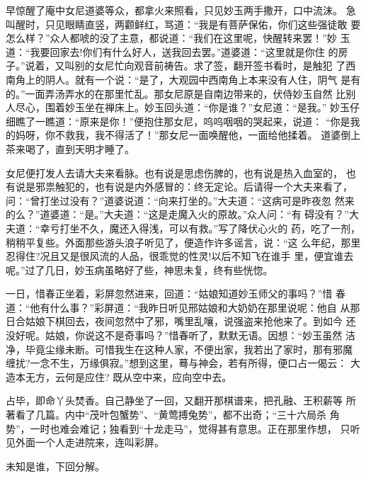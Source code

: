 早惊醒了庵中女尼道婆等众，都拿火来照看，只见妙玉两手撒开，口中流沫。
急叫醒时，只见眼睛直竖，两颧鲜红，骂道：“我是有菩萨保佑，你们这些强徒敢
要怎么样？”众人都唬的没了主意，都说道：“我们在这里呢，快醒转来罢！”妙
玉道：“我要回家去!你们有什么好人，送我回去罢。”道婆道：“这里就是你住
的房子。”说着，又叫别的女尼忙向观音前祷告。求了签，翻开签书看时，是触犯
了西南角上的阴人。就有一个说：“是了，大观园中西南角上本来没有人住，阴气
是有的。”一面弄汤弄水的在那里忙乱。那女尼原是自南边带来的，伏侍妙玉自然
比别人尽心，围着妙玉坐在禅床上。妙玉回头道：“你是谁？”女尼道：“是我。”
妙玉仔细瞧了一瞧道：“原来是你！”便抱住那女尼，呜呜咽咽的哭起来，说道：
“你是我的妈呀，你不救我，我不得活了！”那女尼一面唤醒他，一面给他揉着。
道婆倒上茶来喝了，直到天明才睡了。

女尼便打发人去请大夫来看脉。也有说是思虑伤脾的，也有说是热入血室的，
也有说是邪祟触犯的，也有说是内外感冒的：终无定论。后请得一个大夫来看了，
问：“曾打坐过没有？”道婆说道：“向来打坐的。”大夫道：“这病可是昨夜忽
然来的么？”道婆道：“是。”大夫道：“这是走魔入火的原故。”众人问：“有
碍没有？”大夫道：“幸亏打坐不久，魔还入得浅，可以有救。”写了降伏心火的
药，吃了一剂，稍稍平复些。外面那些游头浪子听见了，便造作许多谣言，说：“这
么年纪，那里忍得住?况且又是很风流的人品，很乖觉的性灵!以后不知飞在谁手
里，便宜谁去呢。”过了几日，妙玉病虽略好了些，神思未复，终有些恍惚。

一日，惜春正坐着，彩屏忽然进来，回道：“姑娘知道妙玉师父的事吗？”惜
春道：“他有什么事？”彩屏道：“我昨日听见邢姑娘和大奶奶在那里说呢：他自
从那日合姑娘下棋回去，夜间忽然中了邪，嘴里乱嚷，说强盗来抢他来了。到如今
还没好呢。姑娘，你说这不是奇事吗？”惜春听了，默默无语。因想：“妙玉虽然
洁净，毕竟尘缘未断。可惜我生在这种人家，不便出家，我若出了家时，那有邪魔
缠扰?一念不生，万缘俱寂。”想到这里，蓦与神会，若有所得，便口占一偈云：
大造本无方，云何是应住?
既从空中来，应向空中去。

占毕，即命丫头焚香。自己静坐了一回，又翻开那棋谱来，把孔融、王积薪等
所著看了几篇。内中“茂叶包蟹势”、“黄莺搏兔势”，都不出奇；“三十六局杀
角势”，一时也难会难记；独看到“十龙走马”，觉得甚有意思。正在那里作想，
只听见外面一个人走进院来，连叫彩屏。

未知是谁，下回分解。
